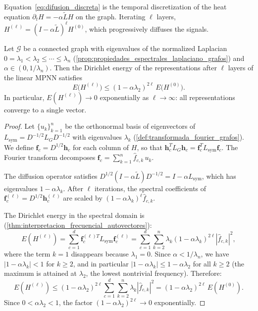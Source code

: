 Equation~\eqref{eq:difusion_discreta} is the temporal discretization of the heat equation $\partial_t H = -\alpha \tilde{L} H$ on the graph. Iterating $\ell$ layers, $H^{(\ell)} = (I - \alpha \tilde{L})^\ell H^{(0)}$, which progressively diffuses the signals.

\begin{theorem}\label{thm:oversmoothing_convergencia}
	Let $\mathcal{G}$ be a connected graph with eigenvalues of the normalized Laplacian $0 = \lambda_1 < \lambda_2 \leq \cdots \leq \lambda_n$ (\autoref{prop:propiedades_espectrales_laplaciano_grafos}) and $\alpha \in (0, 1/\lambda_n)$. Then the Dirichlet energy of the representations after $\ell$ layers of the linear \gls{MPNN} satisfies
	\begin{equation}\label{eq:oversmoothing_bound}
		E\bigl(H^{(\ell)}\bigr) \leq (1 - \alpha\lambda_2)^{2\ell}\, E\bigl(H^{(0)}\bigr).
	\end{equation}
	In particular, $E(H^{(\ell)}) \to 0$ exponentially as $\ell \to \infty$: all representations converge to a single vector.
\end{theorem}

\begin{proof}
	Let $\{u_k\}_{k=1}^n$ be the orthonormal basis of eigenvectors of $L_{\mathrm{sym}} = D^{-1/2} L_G D^{-1/2}$ with eigenvalues $\lambda_k$ (\autoref{def:transformada_fourier_grafos}). We define $\mathbf{f}_c = D^{1/2}\mathbf{h}_c$ for each column of $H$, so that $\mathbf{h}_c^T L_G \mathbf{h}_c = \mathbf{f}_c^T L_{\mathrm{sym}} \mathbf{f}_c$. The Fourier transform decomposes $\mathbf{f}_c = \sum_{k=1}^n \hat{f}_{c,k}\, u_k$.

	The diffusion operator satisfies $D^{1/2}(I - \alpha \tilde{L})D^{-1/2} = I - \alpha L_{\mathrm{sym}}$, which has eigenvalues $1 - \alpha\lambda_k$. After $\ell$ iterations, the spectral coefficients of $\mathbf{f}_c^{(\ell)} = D^{1/2}\mathbf{h}_c^{(\ell)}$ are scaled by $(1-\alpha\lambda_k)^\ell \hat{f}_{c,k}$.

	The Dirichlet energy in the spectral domain is (\autoref{thm:interpretacion_frecuencial_autovectores}):
	\[
		E(H^{(\ell)}) = \sum_{c=1}^d \mathbf{f}_c^{(\ell)T} L_{\mathrm{sym}} \mathbf{f}_c^{(\ell)} = \sum_{c=1}^d \sum_{k=2}^n \lambda_k (1-\alpha\lambda_k)^{2\ell} |\hat{f}_{c,k}|^2,
	\]
	where the term $k=1$ disappears because $\lambda_1 = 0$. Since $\alpha < 1/\lambda_n$, we have $|1-\alpha\lambda_k| < 1$ for $k \geq 2$, and in particular $|1-\alpha\lambda_k| \leq 1-\alpha\lambda_2$ for all $k \geq 2$ (the maximum is attained at $\lambda_2$, the lowest nontrivial frequency). Therefore:
	\[
		E(H^{(\ell)}) \leq (1-\alpha\lambda_2)^{2\ell} \sum_{c=1}^d \sum_{k=2}^n \lambda_k |\hat{f}_{c,k}|^2
		= (1-\alpha\lambda_2)^{2\ell}\, E(H^{(0)}).
	\]
	Since $0 < \alpha\lambda_2 < 1$, the factor $(1-\alpha\lambda_2)^{2\ell} \to 0$ exponentially.
\end{proof}

